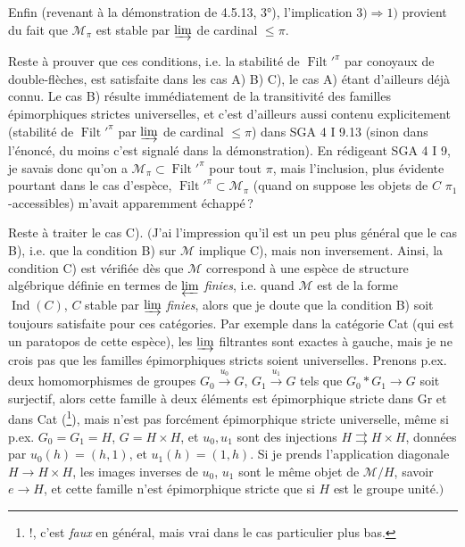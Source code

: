 \documentclass[11pt]{article}
\newcommand{\msp}[1]{\marginpar{\footnotesize [#1]}}
\newcommand{\Filt}{\operatorname{Filt}}
\newcommand{\Ind}{\operatorname{Ind}}
\begin{document}
\msp{page 134}
Enfin (revenant à la démonstration de 4.5.13, 3°), l'implication $3) \Longrightarrow 1)$ provient du fait que $\mathcal{M}_{\pi}$ est stable par $\varinjlim$ de cardinal $\leqslant \pi$.

Reste à prouver que ces conditions, i.e. la stabilité de $\Filt'^{\pi}$ par conoyaux de double-flèches, est satisfaite dans les cas A) B) C), le cas A) étant d'ailleurs déjà connu. Le cas B) résulte immédiatement de la transitivité des familles épimorphiques strictes universelles, et c'est d'ailleurs aussi contenu explicitement (stabilité de $\Filt'^{\pi}$ par $\varinjlim$ de cardinal $\leqslant \pi$) dans SGA 4 I 9.13 (sinon dans l'énoncé, du moins c'est signalé dans la démonstration). En rédigeant SGA 4 I 9, je savais donc qu'on a $\mathcal{M}_{\pi} \subset \Filt'^{\pi}$ pour tout $\pi$, mais l'inclusion, plus évidente pourtant dans le cas d'espèce, $\Filt'^{\pi} \subset \mathcal{M}_{\pi}$ (quand on suppose les objets de $C$ $\pi_1$-accessibles) m'avait apparemment échappé\,?

Reste à traiter le cas C). $\Big($J'ai l'impression qu'il est un peu plus général que le cas B), i.e. que la condition B) sur $\mathcal{M}$ implique C), mais non inversement. Ainsi, la condition C) est vérifiée dès que $\mathcal{M}$ correspond à une espèce de structure algébrique définie en
\msp{page 135}
termes de $\varprojlim$ \textit{finies}, i.e. quand $\mathcal{M}$ est de la forme $\Ind(C)$, $C$ stable par $\varinjlim$ \textit{finies}, alors que je doute que la condition B) soit toujours satisfaite pour ces catégories. Par exemple dans la catégorie Cat (qui est un paratopos de cette espèce), les $\varinjlim$ filtrantes sont exactes à gauche, mais je ne crois pas que les familles épimorphiques stricts soient universelles. %
Prenons p.ex. deux homomorphismes de groupes $G_0 \xrightarrow{u_0} G$, $G_1 \xrightarrow{u_1} G$ tels que $G_0 * G_1 \longrightarrow G$ soit surjectif, alors cette famille à deux éléments est épimorphique stricte dans Gr et dans Cat (\footnote{!, c'est \textit{faux} en général, mais vrai dans le cas particulier plus bas.}), mais n'est pas forcément épimorphique stricte universelle, même si p.ex. $G_0 = G_1 = H$, $G = H \times H$, et $u_0, u_1$ sont des injections $H \rightrightarrows H \times H$, données par $u_0(h) = (h,1)$, et $u_1(h) = (1,h)$. Si je prends l'application diagonale $H \longrightarrow H \times H$, les images inverses de $u_0$, $u_1$ sont le même objet de $\mathcal{M}/H$, savoir $e \longrightarrow H$, et cette famille n'est épimorphique stricte que si $H$ est le groupe unité.$\Big)$
\end{document}
